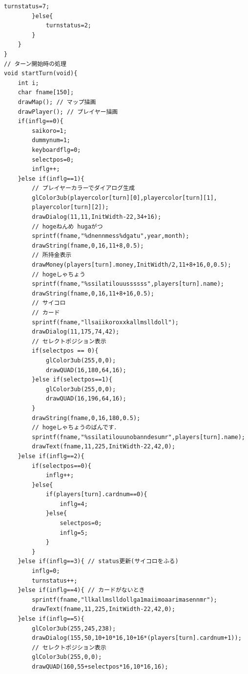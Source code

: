 \documentclass[a4j]{jarticle}
\begin{document}
\begin{lstlisting}[basicstyle=\ttfamily\footnotesize, frame=single,label=code2,caption=game.c]
            turnstatus=7;
        }else{
            turnstatus=2;
        }
    }
}
// ターン開始時の処理
void startTurn(void){
    int i;
    char fname[150];
    drawMap(); // マップ描画
    drawPlayer(); // プレイヤー描画
    if(inflg==0){
        saikoro=1;
        dummynum=1;
        keyboardflg=0;
        selectpos=0;
        inflg++;
    }else if(inflg==1){
        // プレイヤーカラーでダイアログ生成
        glColor3ub(playercolor[turn][0],playercolor[turn][1],
        playercolor[turn][2]);
        drawDialog(11,11,InitWidth-22,34+16);
        // hogeねんめ hugaがつ
        sprintf(fname,"%dnennmess%dgatu",year,month);
        drawString(fname,0,16,11+8,0.5);
        // 所持金表示
        drawMoney(players[turn].money,InitWidth/2,11+8+16,0,0.5);
        // hogeしゃちょう
        sprintf(fname,"%ssilatilouussssss",players[turn].name);
        drawString(fname,0,16,11+8+16,0.5);   
        // サイコロ
        // カード
        sprintf(fname,"llsaiikoroxxkallmslldoll");
        drawDialog(11,175,74,42);
        // セレクトポジション表示
        if(selectpos == 0){
            glColor3ub(255,0,0);
            drawQUAD(16,180,64,16);                 
        }else if(selectpos==1){
            glColor3ub(255,0,0);
            drawQUAD(16,196,64,16);               
        }   
        drawString(fname,0,16,180,0.5);
        // hogeしゃちょうのばんです．
        sprintf(fname,"%ssilatilouunobanndesumr",players[turn].name);
        drawText(fname,11,225,InitWidth-22,42,0);      
    }else if(inflg==2){
        if(selectpos==0){
            inflg++;
        }else{
            if(players[turn].cardnum==0){
                inflg=4;
            }else{
                selectpos=0;
                inflg=5;
            }
        }
    }else if(inflg==3){ // status更新(サイコロをふる)
        inflg=0;
        turnstatus++;
    }else if(inflg==4){ // カードがないとき
        sprintf(fname,"llkallmslldollga1maiimoaarimasennmr");
        drawText(fname,11,225,InitWidth-22,42,0);               
    }else if(inflg==5){
        glColor3ub(255,245,238);
        drawDialog(155,50,10+10*16,10+16*(players[turn].cardnum+1));
        // セレクトポジション表示
        glColor3ub(255,0,0);
        drawQUAD(160,55+selectpos*16,10*16,16);                 
        

\end{lstlisting}
\end{document}
